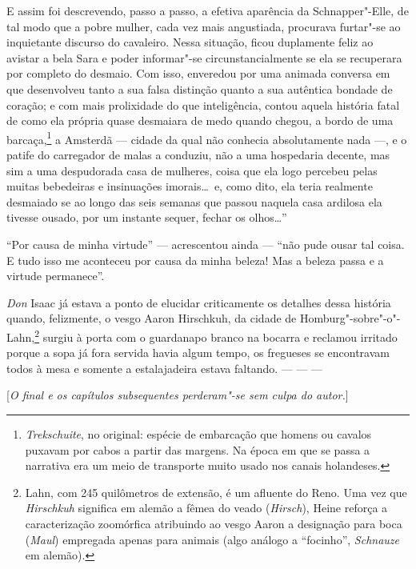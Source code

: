 E assim foi descrevendo, passo a passo, a efetiva aparência da
Schnapper"-Elle, de tal modo que a pobre mulher, cada vez mais
angustiada, procurava furtar"-se ao inquietante discurso do cavaleiro.
Nessa situação, ficou duplamente feliz ao avistar a bela Sara e poder
informar"-se circunstancialmente se ela se recuperara por completo do
desmaio. Com isso, enveredou por uma animada conversa em que
desenvolveu tanto a sua falsa distinção quanto a sua autêntica bondade
de coração; e com mais prolixidade do que inteligência, contou aquela
história fatal de como ela própria quase desmaiara de medo quando
chegou, a bordo de uma
barcaça,\footnote{
\textit{Trekschuite}, no original: espécie de embarcação que homens ou
cavalos puxavam por cabos a partir das margens. Na época em que se
passa a narrativa era um meio de transporte muito usado nos canais
holandeses.}
a Amsterdã --- cidade da qual não conhecia absolutamente nada ---, e o
patife do carregador de malas a conduziu, não a uma hospedaria decente,
mas sim a uma despudorada casa de mulheres, coisa que ela logo percebeu
pelas muitas bebedeiras e insinuações imorais\ldots\ e, como dito, ela
teria realmente desmaiado se ao longo das seis semanas que passou
naquela casa ardilosa ela tivesse ousado, por um instante sequer,
fechar os olhos\ldots''

``Por causa de minha virtude'' --- acrescentou ainda --- ``não pude ousar tal
coisa. E tudo isso me aconteceu por causa da minha beleza! Mas a beleza
passa e a virtude permanece''.

\textit{Don} Isaac já estava a ponto de elucidar criticamente os
detalhes dessa história quando, felizmente, o vesgo Aaron Hirschkuh, da
cidade de
Homburg"-sobre"-o"-Lahn,\footnote{ Lahn, com 245 quilômetros de extensão, é um afluente do 
Reno. Uma vez que \textit{Hirschkuh} significa em alemão a fêmea do veado
(\textit{Hirsch}), Heine reforça a caracterização zoomórfica atribuindo		\EP[-1.2]
ao vesgo Aaron a designação para boca (\textit{Maul}) empregada apenas
para animais (algo análogo a ``focinho'', \textit{Schnauze} em alemão).}
surgiu à porta com o guardanapo branco na bocarra e reclamou irritado
porque a sopa já fora servida havia algum tempo, os fregueses se
encontravam todos à mesa e somente a estalajadeira estava faltando. --- ---
---

\bigskip

[\textit{O final e os capítulos subsequentes perderam"-se sem culpa do
autor.}]

